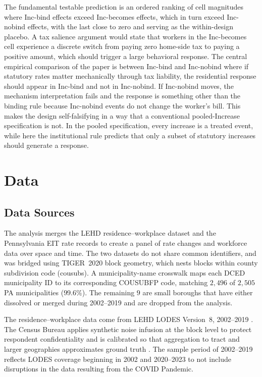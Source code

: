 \documentclass[12pt]{article}
\begin{document}
The fundamental testable prediction is an
ordered ranking of cell magnitudes where Inc-bind effects exceed
Inc-becomes effects, which in turn exceed Inc-nobind effects, with
the last close to zero and serving as the
within-design placebo. A tax salience argument would state that workers in the Inc-becomes cell
experience a discrete switch from paying zero home-side tax to
paying a positive amount, which should trigger a large behavioral response. The
central empirical comparison of the paper is between Inc-bind and
Inc-nobind where if statutory rates matter mechanically through tax
liability, the residential response should appear in Inc-bind and
not in Inc-nobind. If Inc-nobind moves, the mechanism
interpretation fails and the response is something other than the
binding rule because Inc-nobind events do not change the worker's
bill. This makes the design self-falsifying in a way that a
conventional pooled-Increase specification is not. In the pooled
specification, every increase is a treated event, while here the
institutional rule predicts that only a subset of statutory
increases should generate a response.

\section{Data}
\label{sec:data}

\subsection{Data Sources}
\label{subsec:sources}
\label{subsec:sample}
\label{subsec:pipeline}

The analysis merges the LEHD  residence--workplace dataset and the  Pennsylvania EIT rate records to create a panel of rate changes and workforce data over space and time. The two datasets do not share common identifiers, and was bridged using TIGER~2020 block geometry, which
nests blocks within county subdivision code (cousubs). A
municipality-name crosswalk maps each DCED municipality ID to its
corresponding COUSUBFP code, matching $2{,}496$ of $2{,}505$ PA municipalities
($99.6\%$). The remaining $9$ are small boroughs that have either dissolved or
merged during 2002--2019 and are dropped from the analysis.

The residence--workplace data come from LEHD LODES Version~8,
2002--2019 \citep{lehdLODES}. The Census Bureau applies
synthetic noise infusion at the block level to protect respondent
confidentiality and is calibrated so that aggregation to tract and larger
geographies approximates ground truth
\citep{grahamDESIGNCOMPARISONLODES}. The sample period of 2002--2019
reflects LODES coverage beginning in 2002 and
2020--2023 to not include disruptions in the data resulting from the COVID Pandemic.
\end{document}
